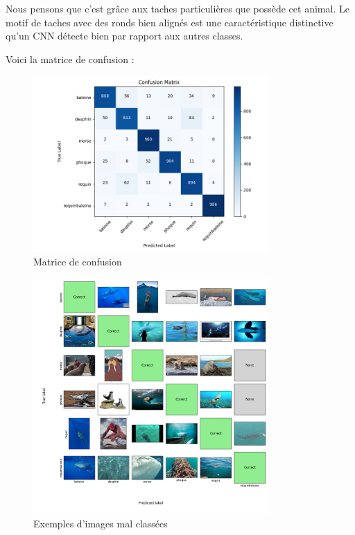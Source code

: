 \documentclass{article}
\begin{document}
Nous pensons que c’est grâce aux taches particulières que possède cet animal. Le motif de taches avec des ronds bien alignés est une caractéristique distinctive qu'un CNN détecte bien par rapport aux autres classes.

Voici la matrice de confusion :

\begin{figure}[H]
    \centering
    \includegraphics[width=0.8\textwidth]{assets/confusion_matrix.png}
    \caption{Matrice de confusion}
\end{figure}

\begin{figure}[H]
    \centering
    \includegraphics[width=0.8\textwidth]{assets/misclassified_grid.png}
    \caption{Exemples d'images mal classées}
\end{figure}
\end{document}
